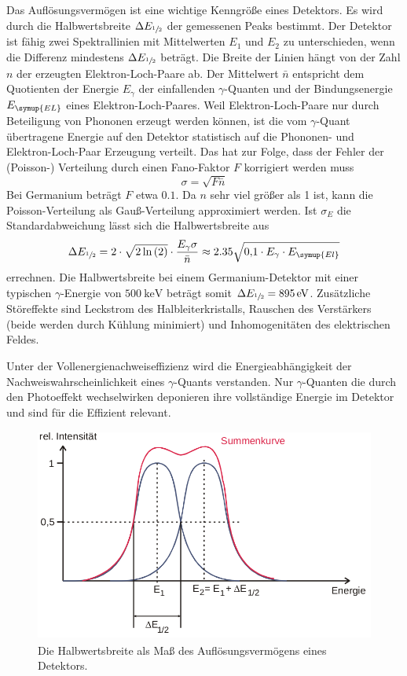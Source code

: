 Das Auflösungsvermögen ist eine wichtige Kenngröße eines Detektors.
Es wird durch die Halbwertsbreite $\Delta E_{\sfrac{1}{2}}$ der gemessenen Peaks bestimmt.
Der Detektor ist fähig zwei Spektrallinien mit Mittelwerten $E_1$ und $E_2$ zu unterschieden, wenn die Differenz mindestens $\Delta E_{\sfrac{1}{2}}$ beträgt.
Die Breite der Linien hängt von der Zahl $n$ der erzeugten Elektron-Loch-Paare ab.
Der Mittelwert $\bar{n}$ entspricht dem Quotienten der Energie $E_{\gamma}$ der einfallenden $\gamma$-Quanten und der Bindungsenergie $E_{\symup{EL}}$ eines Elektron-Loch-Paares.
Weil Elektron-Loch-Paare nur durch Beteiligung von Phononen erzeugt werden können, ist die vom $\gamma$-Quant übertragene Energie auf den Detektor statistisch auf die Phononen- und Elektron-Loch-Paar Erzeugung verteilt.
Das hat zur Folge, dass der Fehler der (Poisson-) Verteilung durch einen Fano-Faktor $F$ korrigiert werden muss
\begin{equation*}
\sigma = \sqrt{F\bar{n}}
\end{equation*}
Bei Germanium beträgt $F$ etwa $0.1$.
Da $n$ sehr viel größer als \num{1} ist, kann die Poisson-Verteilung als Gauß-Verteilung approximiert werden.
Ist $\sigma_E$ die Standardabweichung lässt sich die Halbwertsbreite aus
\begin{equation}
\label{eq:aufloesung}
\Delta E_{\sfrac{1}{2}} = 2 \cdot \sqrt{2\ln{(2)}}\cdot\frac{E_{\gamma}\sigma}{\bar{n}} \approx 2.35\sqrt{\num{0.1} \cdot E_\gamma \cdot E_{\symup{El}}}
\end{equation}
errechnen.
Die Halbwertsbreite bei einem Germanium-Detektor mit einer typischen $\gamma$-Energie von $\SI{500}{\kilo\electronvolt}$ beträgt somit $\Delta E_{\sfrac{1}{2}} =\SI{895}{\electronvolt}$.
Zusätzliche Störeffekte sind Leckstrom des Halbleiterkristalls, Rauschen des Verstärkers (beide werden durch Kühlung minimiert) und Inhomogenitäten des elektrischen Feldes.

Unter der Vollenergienachweiseffizienz wird die Energieabhängigkeit der Nachweiswahrscheinlichkeit eines $\gamma$-Quants verstanden.
Nur $\gamma$-Quanten die durch den Photoeffekt wechselwirken deponieren ihre vollständige Energie im Detektor und sind für die Effizient relevant.

 \begin{figure}
   \centering
   \includegraphics[height=7cm]{content/pictures/Breite.png}
   \caption{Die Halbwertsbreite als Maß des Auflösungsvermögens eines Detektors.\cite{V18}}
   \label{fig:Breite}
 \end{figure}

